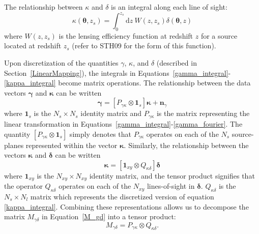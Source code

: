 \documentclass[twocolumn]{emulateapj}
\newcommand{\dd}{\mathrm{d}} %
\newcommand{\myvec}[1]{\boldsymbol{#1}}
\newcommand{\mymat}[1]{#1}
\begin{document}
The relationship between $\kappa$ and $\delta$ is an integral along each
line of sight:
\begin{equation}
  \label{kappa_integral}
  \kappa(\myvec\theta,z_s) = 
  \int_0^{z_s}\dd z\ W(z,z_s)\delta(\myvec\theta,z)
\end{equation}
where $W(z,z_s)$ is the lensing efficiency function at redshift $z$ 
for a source located at redshift $z_s$ 
(refer to STH09 for the form of this function).

Upon discretization of the quantities $\gamma$, $\kappa$, and $\delta$
(described in Section~\ref{LinearMapping}), 
the integrals in Equations~\ref{gamma_integral}-\ref{kappa_integral} 
become matrix operations.  The relationship between the data vectors
$\myvec{\gamma}$ and $\myvec{\kappa}$ can be written
\begin{equation}
  \label{P_gk}
  \myvec\gamma = [\mymat{P}_{\gamma\kappa} \otimes \mathbf{1}_s]\myvec\kappa 
  + \myvec{n}_\gamma
\end{equation}
where $\mathbf{1}_s$ is the $N_s \times N_s$ identity matrix and 
$\mymat{P}_{\gamma\kappa}$ is the matrix representing the linear 
transformation in Equations~\ref{gamma_integral}-\ref{gamma_fourier}.  
The quantity $[\mymat{P}_{\gamma\kappa} \otimes \mathbf{1}_s]$ 
simply denotes that $\mymat{P}_{\gamma\kappa}$ operates on each of the $N_s$ 
source-planes represented within the vector $\myvec\kappa$.
Similarly, the relationship between the vectors $\myvec{\kappa}$ and
$\myvec{\delta}$ can be written
\begin{equation}
  \label{Q_kd}
  \myvec\kappa = [\mathbf{1}_{xy} \otimes \mymat{Q}_{\kappa\delta}]\myvec\delta
\end{equation}
where $\mathbf{1}_{xy}$ is the $N_{xy} \times N_{xy}$ 
identity matrix, and the tensor product signifies that the operator 
$Q_{\kappa\delta}$ operates on each of the $N_{xy}$ lines-of-sight in
$\myvec\delta$.  $Q_{\kappa\delta}$ is the $N_s \times N_l$ matrix which
represents the discretized version of equation \ref{kappa_integral}.
Combining these representations allows us to decompose the matrix 
$\mymat{M}_{\gamma\delta}$ in Equation~\ref{M_gd} into a tensor product:
\begin{equation}
  \mymat{M}_{\gamma\delta} = 
  \mymat{P}_{\gamma\kappa} \otimes \mymat{Q}_{\kappa\delta}.
\end{equation}
\end{document}

